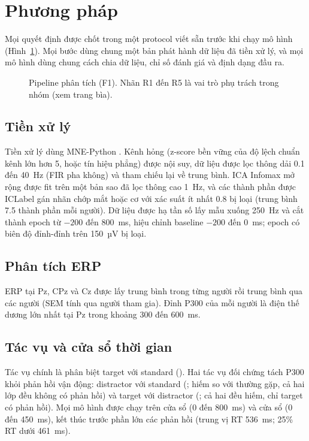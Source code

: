 \section{Phương pháp}
\label{ch:methods}

Mọi quyết định được chốt trong một protocol viết sẵn trước khi chạy mô hình (Hình~\ref{fig:pipeline}). Mọi bước dùng chung một bản phát hành dữ liệu đã tiền xử lý, và mọi mô hình dùng chung cách chia dữ liệu, chỉ số đánh giá và định dạng đầu ra.

\begin{figure}[H]
\centering
{}
\caption{Pipeline phân tích (F1). Nhãn R1 đến R5 là vai trò phụ trách trong nhóm (xem trang bìa).}
\label{fig:pipeline}
\end{figure}

\subsection{Tiền xử lý}
\label{sec:preprocessing}
Tiền xử lý dùng MNE-Python \citep{gramfort2013}. Kênh hỏng (z-score bền vững của độ lệch chuẩn kênh lớn hơn 5, hoặc tín hiệu phẳng) được nội suy, dữ liệu được lọc thông dải 0.1 đến 40~Hz (FIR pha không) và tham chiếu lại về trung bình. ICA Infomax mở rộng được fit trên một bản sao đã lọc thông cao 1~Hz, và các thành phần được ICLabel \citep{piontonachini2019} gán nhãn chớp mắt hoặc cơ với xác suất ít nhất 0.8 bị loại (trung bình 7.5 thành phần mỗi người). Dữ liệu được hạ tần số lấy mẫu xuống 250~Hz và cắt thành epoch từ $-200$ đến 800~ms, hiệu chỉnh baseline $-200$ đến 0~ms; epoch có biên độ đỉnh-đỉnh trên 150~µV bị loại.

\subsection{Phân tích ERP}
\label{sec:erp-methods}
ERP tại Pz, CPz và Cz được lấy trung bình trong từng người rồi trung bình qua các người (SEM tính qua người tham gia). Đỉnh P300 của mỗi người là điện thế dương lớn nhất tại Pz trong khoảng 300 đến 600~ms.

\subsection{Tác vụ và cửa sổ thời gian}
\label{sec:tasks}
Tác vụ chính là phân biệt target với standard (). Hai tác vụ đối chứng tách P300 khỏi phản hồi vận động: distractor với standard (; hiếm so với thường gặp, cả hai lớp đều không có phản hồi) và target với distractor (; cả hai đều hiếm, chỉ target có phản hồi). Mọi mô hình được chạy trên cửa sổ  (0 đến 800~ms) và cửa sổ  (0 đến 450~ms), kết thúc trước phần lớn các phản hồi (trung vị RT 536~ms; 25\% RT dưới 461~ms).

